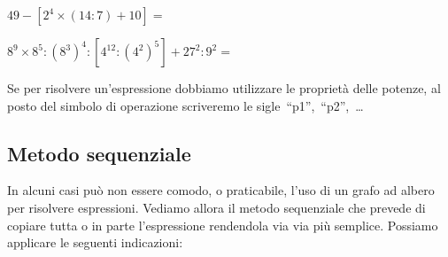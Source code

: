  \begin{esempio}{}{}
  \(49 - [2^4 \times (14 : 7) + 10]=\)

\end{esempio}

\begin{esempio}{}{}
  \(8^9 \times 8^5 : (8^3)^4 : [4^{12} : (4^2)^5] + 27^2 : 9^2 =\)

Se per risolvere un'espressione dobbiamo utilizzare le proprietà delle 
potenze, al posto del simbolo di operazione scriveremo le 
sigle~``p1'',~``p2'',~\dots 

\begin{inaccessibleblock}[]
 \begin{center} \espalberob \end{center}
\end{inaccessibleblock}
 \end{esempio}

\subsection{Metodo sequenziale}

In alcuni casi può non essere comodo, o praticabile, l'uso di un grafo ad 
albero per risolvere espressioni. 
Vediamo allora il metodo sequenziale che prevede di copiare tutta o in 
parte l'espressione rendendola via via più semplice. 
Possiamo applicare le seguenti indicazioni:

